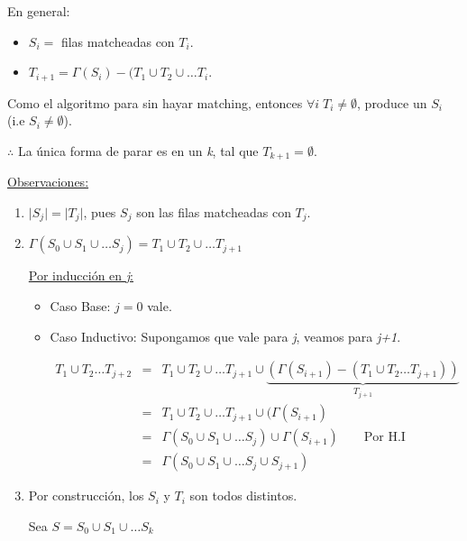 \documentclass[12pt,a4paper]{report}
\newcounter{neq}
\begin{document}
			En general:
			\begin{center}
			\begin{itemize}
				\item $S_{i} =$ filas matcheadas con $T_{i}$.
				\item $T_{i+1} = \Gamma(S_{i}) - (T_{1} \cup T_{2} \cup \dotsc T_{i}$.
			\end{itemize}
			\end{center}
			
			Como el algoritmo para sin hayar matching, entonces $\forall i \; T_{i} \neq \emptyset $, produce un $S_{i}$  (i.e $S_{i} \neq \emptyset$).
			
			$\therefore$ La única forma de parar es en un \textit{k}, tal que $T_{k+1} = \emptyset$.
			
			\underline{Observaciones:}
			\begin{enumerate}
				\item $\lvert S_{j} \rvert = \lvert T_{j} \rvert$, pues $S_{j}$ son las filas matcheadas con $T_{j}$.
				\item $\Gamma(S_{0} \cup S_{1} \cup \dotsc S_{j}) = T_{1} \cup T_{2} \cup \dotsc T_{j+1}$
				
					\underline{Por inducción en \textit{j}:}
					\begin{itemize}
						\item Caso Base: $j = 0$ vale.
						\item Caso Inductivo: Supongamos que vale para \textit{j}, veamos para \textit{j+1}.
						
						\begin{eqnarray}
							\nonumber T_{1} \cup T_{2} \dotsc T_{j+2} &=& T_{1} \cup T_{2} \cup \dotsc T_{j+1} \cup \underbrace{(\Gamma(S_{i+1}) - (T_{1} \cup T_{2} \dotsc T_{j+1}))}_{T_{j+1}} \\
							\nonumber &=& T_{1} \cup T_{2} \cup \dotsc T_{j+1} \cup (\Gamma(S_{i+1}) \\
							\nonumber &=& \Gamma(S_{0} \cup S_{1} \cup \dotsc S_{j}) \cup \Gamma(S_{i+1}) \qquad \text{Por H.I} \\
							\nonumber &=& \Gamma(S_{0} \cup S_{1} \cup \dotsc S_{j} \cup S_{j+1}) 
						\end{eqnarray}
					\end{itemize}
					
				\item Por construcción, los $S_{i}$ y $T_{i}$ son todos distintos.
				
					Sea $S = S_{0} \cup S_{1} \cup \dotsc S_{k}$
					

\end{enumerate}
\end{document}
